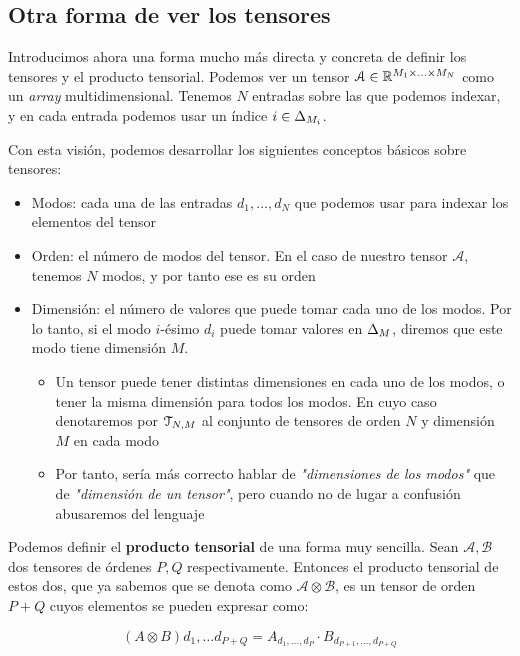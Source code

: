 \subsection{Otra forma de ver los tensores} \label{sec:otra_forma_tensores}

Introducimos ahora una forma mucho más directa y concreta de definir los tensores y el producto tensorial. Podemos ver un tensor $\mathcal{A} \in \mathbb{R}^{M_1 \times \ldots \times M_N}$ como un \textit{array} multidimensional. Tenemos $N$ entradas sobre las que podemos indexar, y en cada entrada podemos usar un índice $i \in \Delta_{M_i}$.

Con esta visión, podemos desarrollar los siguientes conceptos básicos sobre tensores:

\begin{itemize}
    \item Modos: cada una de las entradas $d_1, \ldots, d_N$ que podemos usar para indexar los elementos del tensor
    \item Orden: el número de modos del tensor. En el caso de nuestro tensor $\mathcal{A}$, tenemos $N$ modos, y por tanto ese es su orden
    \item Dimensión: el número de valores que puede tomar cada uno de los modos. Por lo tanto, si el modo $i$-ésimo $d_i$ puede tomar valores en $\Delta_{M}$, diremos que este modo tiene dimensión $M$.
        \begin{itemize}
            \item Un tensor puede tener distintas dimensiones en cada uno de los modos, o tener la misma dimensión para todos los modos. En cuyo caso denotaremos por $\mathcal{T}_{N, M}$ al conjunto de tensores de orden $N$ y dimensión $M$ en cada modo
            \item Por tanto, sería más correcto hablar de \textit{"dimensiones de los modos"} que de \textit{"dimensión de un tensor"}, pero cuando no de lugar a confusión abusaremos del lenguaje
        \end{itemize}
\end{itemize}

Podemos definir el \textbf{producto tensorial} de una forma muy sencilla. Sean $\mathcal{A}, \mathcal{B}$ dos tensores de órdenes $P, Q$ respectivamente. Entonces el producto tensorial de estos dos, que ya sabemos que se denota como $\mathcal{A} \otimes \mathcal{B}$, es un tensor de orden $P + Q$ cuyos elementos se pueden expresar como:

$$(A \otimes B)d_1, \ldots d_{P + Q} = A_{d_1, \ldots, d_P} \cdot B_{d_{P + 1}, \ldots, d_{P + Q}}$$


